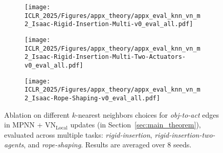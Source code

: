\begin{figure*}[t]
    \centering
    \hfill
    \begin{subfigure}[b]{0.32\linewidth}
        \texttt{[image: ICLR\_2025/Figures/appx\_theory/appx\_eval\_knn\_vn\_m2\_Isaac-Rigid-Insertion-Multi-v0\_eval\_all.pdf]}
    \end{subfigure}
    \hfill
    \begin{subfigure}[b]{0.32\linewidth}
        \texttt{[image: ICLR\_2025/Figures/appx\_theory/appx\_eval\_knn\_vn\_m2\_Isaac-Rigid-Insertion-Multi-Two-Actuators-v0\_eval\_all.pdf]}
    \end{subfigure}
    \hfill
    \begin{subfigure}[b]{0.32\linewidth}
        \texttt{[image: ICLR\_2025/Figures/appx\_theory/appx\_eval\_knn\_vn\_m2\_Isaac-Rope-Shaping-v0\_eval\_all.pdf]}
    \end{subfigure}
    \hfill
    \caption{Ablation on different $k$-nearest neighbors choices for \textit{obj-to-act} edges in $\text{MPNN}$ + $\text{VN}_{\text {Local}}$ updates (in Section~\ref{sec:main_theorem}), evaluated across multiple tasks: \textit{rigid-insertion}, \textit{rigid-insertion-two-agents}, and \textit{rope-shaping}. Results are averaged over 8 seeds.}
    \vspace{-0.2cm}
    \label{fig:appx_knn_vn_num_mess0}
\end{figure*}
